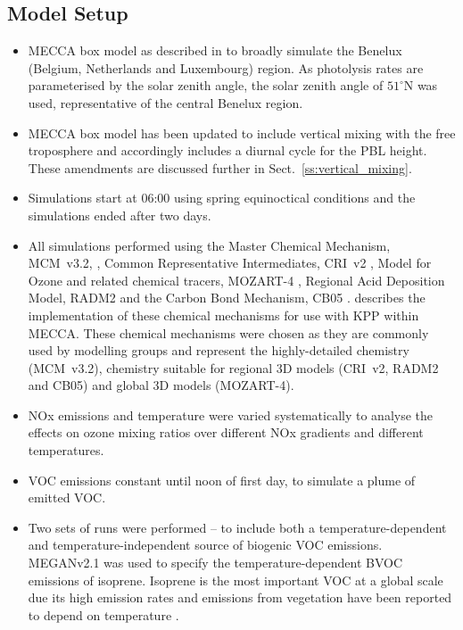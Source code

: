 \subsection{Model Setup} \label{ss:model_setup}
\begin{itemize}
    \item MECCA box model as described in \citet{Coates:2015} to broadly simulate the Benelux (Belgium, Netherlands and Luxembourg) region. As photolysis rates are parameterised by the solar zenith angle, the solar zenith angle of $51^{\circ}$N was used, representative of the central Benelux region.
    \item MECCA box model has been updated to include vertical mixing with the free troposphere and accordingly includes a diurnal cycle for the PBL height. These amendments are discussed further in Sect.~\ref{ss:vertical_mixing}.
    \item Simulations start at 06:00 using spring equinoctical conditions and the simulations ended after two days.
    \item All simulations performed using the Master Chemical Mechanism, MCM~v3.2, \citep{MCM_Site}, Common Representative Intermediates, CRI~v2 \citep{Jenkin:2008}, Model for Ozone and related chemical tracers, MOZART-4 \citep{Emmons:2010}, Regional Acid Deposition Model, RADM2 \citep{Stockwell:1990} and the Carbon Bond Mechanism, CB05 \citep{Yarwood:2005}. \citet{Coates:2015} describes the implementation of these chemical mechanisms for use with KPP within MECCA. These chemical mechanisms were chosen as they are commonly used by modelling groups and represent the highly-detailed chemistry (MCM~v3.2), chemistry suitable for regional 3D models (CRI~v2, RADM2 and CB05) and global 3D models (MOZART-4).
    \item NOx emissions and temperature were varied systematically to analyse the effects on ozone mixing ratios over different NOx gradients and different temperatures.
    \item VOC emissions constant until noon of first day, to simulate a plume of emitted VOC.
    \item Two sets of runs were performed -- to include both a temperature-dependent and temperature-independent source of biogenic VOC emissions. MEGANv2.1 \citep{Guenther:2012} was used to specify the temperature-dependent BVOC emissions of isoprene. Isoprene is the most important VOC at a global scale due its high emission rates and emissions from vegetation have been reported to depend on temperature \citep{Guenther:2006}.

\end{itemize}
